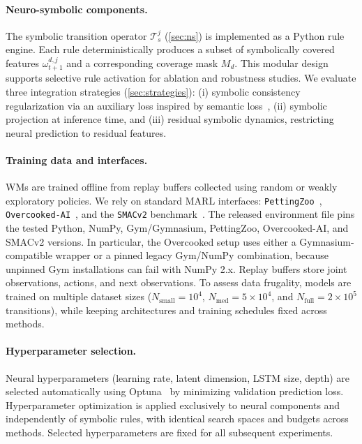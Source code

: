 \documentclass{article}
\theoremstyle{plain}
\theoremstyle{definition}
\theoremstyle{remark}
\begin{document}
\paragraph{Neuro-symbolic components.}
The symbolic transition operator $\mathcal{T}^j_s$ (\autoref{sec:ns}) is implemented as a Python rule engine.
Each rule deterministically produces a subset of symbolically covered features $\omega^{d,j}_{t+1}$
and a corresponding coverage mask $M_d$.
This modular design supports selective rule activation for ablation and robustness studies.
We evaluate three integration strategies (\autoref{sec:strategies}):
(i) symbolic consistency regularization via an auxiliary loss inspired by semantic loss~\cite{Xu2018semanticloss,Fan2017differentiablelearninglogicalrules},
(ii) symbolic projection at inference time,
and (iii) residual symbolic dynamics, restricting neural prediction to residual features.

\paragraph{Training data and interfaces.}
WMs are trained offline from replay buffers collected using random or weakly exploratory policies.
We rely on standard MARL interfaces:
\texttt{PettingZoo}~\cite{terry2020pettingzoo},
\texttt{Overcooked-AI}~\cite{Micah2020overcooked},
and the \texttt{SMACv2} benchmark~\cite{Ellis2023smacv2}.
The released environment file pins the tested Python, NumPy, Gym/Gymnasium,
PettingZoo, Overcooked-AI, and SMACv2 versions. In particular, the Overcooked
setup uses either a Gymnasium-compatible wrapper or a pinned legacy Gym/NumPy
combination, because unpinned Gym installations can fail with NumPy 2.x.
Replay buffers store joint observations, actions, and next observations.
To assess data frugality, models are trained on multiple dataset sizes
($N_{\text{small}}=10^4$, $N_{\text{med}}=5\times 10^4$, and $N_{\text{full}}=2\times 10^5$ transitions),
while keeping architectures and training schedules fixed across methods.

\paragraph{Hyperparameter selection.}
Neural hyperparameters (learning rate, latent dimension, LSTM size, depth)
are selected automatically using Optuna~\cite{akiba2019optuna}
by minimizing validation prediction loss.
Hyperparameter optimization is applied exclusively to neural components
and independently of symbolic rules, with identical search spaces and budgets across methods.
Selected hyperparameters are fixed for all subsequent experiments.
\end{document}
